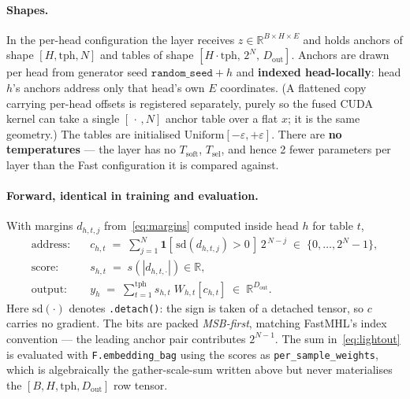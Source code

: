 \documentclass[11pt]{article}
\newcommand{\NAP}{N}
\begin{document}
\paragraph{Shapes.}
In the per-head configuration the layer receives $z\in\mathbb{R}^{B\times H\times E}$ and
holds anchors of shape $[H,\mathrm{tph},\NAP]$ and tables of shape
$[H\!\cdot\!\mathrm{tph},\,2^{\NAP},\,D_{\text{out}}]$. Anchors are drawn per head from
generator seed $\texttt{random\_seed}+h$ and \textbf{indexed head-locally}: head $h$'s
anchors address only that head's own $E$ coordinates. (A flattened copy carrying per-head
offsets is registered separately, purely so the fused CUDA kernel can take a single
$[\,\cdot\,,\NAP]$ anchor table over a flat $x$; it is the same geometry.) The tables are
initialised $\mathrm{Uniform}[-\varepsilon,+\varepsilon]$. There are \textbf{no
temperatures} --- the layer has no $T_{\text{soft}}$, $T_{\text{sel}}$, and hence 2 fewer
parameters per layer than the Fast configuration it is compared against.

\paragraph{Forward, identical in training and evaluation.}
With margins $d_{h,t,j}$ from~\eqref{eq:margins} computed inside head $h$ for table $t$,
\begin{align}
  \text{address:} \quad
    &c_{h,t} \;=\; \sum_{j=1}^{\NAP} \mathbf{1}\!\left[\,\mathrm{sd}(d_{h,t,j})>0\,\right]\,
       2^{\,\NAP-j}
     \;\in\;\{0,\dots,2^{\NAP}-1\},
     \label{eq:lightaddr}\\[2pt]
  \text{score:} \quad & s_{h,t} \;=\; s\!\left(|d_{h,t,\cdot}|\right) \in \mathbb{R},\\[2pt]
  \text{output:} \quad & y_h \;=\; \sum_{t=1}^{\mathrm{tph}} s_{h,t}\;
      W_{h,t}\!\left[c_{h,t}\right] \;\in\;\mathbb{R}^{D_{\text{out}}} .
      \label{eq:lightout}
\end{align}
Here $\mathrm{sd}(\cdot)$ denotes \texttt{.detach()}: the sign is taken of a detached
tensor, so $c$ carries no gradient. The bits are packed \emph{MSB-first}, matching
FastMHL's index convention --- the leading anchor pair contributes $2^{\NAP-1}$. The sum
in~\eqref{eq:lightout} is evaluated with \texttt{F.embedding\_bag} using the scores as
\texttt{per\_sample\_weights}, which is algebraically the gather-scale-sum written above
but never materialises the $[B,H,\mathrm{tph},D_{\text{out}}]$ row tensor.
\end{document}
